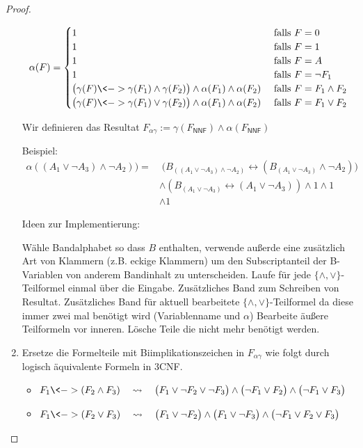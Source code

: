\begin{proof}
\begin{enumerate}
 
 
 $$\alpha(F)=
 \begin{cases}
   1 & \text{ falls } F=0\\
   1 & \text{ falls } F=1\\
   1 & \text{ falls } F=A\\
   1 & \text{ falls } F=\neg F_1\\
   \big(\gamma(F)\<-> \gamma(F_1) \land \gamma(F_2)\big)\land\alpha(F_1)\land\alpha(F_2) & \text{ falls } F=F_1\land F_2\\
   \big(\gamma(F)\<-> \gamma(F_1) \lor \gamma(F_2)\big)\land\alpha(F_1)\land\alpha(F_2) & \text{ falls } F=F_1\lor F_2
  \end{cases}$$
  
  Wir definieren das Resultat $F_{\alpha\gamma}:=\gamma(F_\mathsf{NNF})\land \alpha(F_\mathsf{NNF})$
  
  Beispiel:
  \begin{align*}
   \alpha((A_1\lor \neg A_3)\land \neg A_2)) = & \;
  \big(B_{((A_1\lor \neg A_3)\land \neg A_2)} \leftrightarrow (B_{(A_1\lor \neg A_3)} \land \neg A_2)\big)\\
  & \land (B_{(A_1\lor \neg A_3)} \leftrightarrow (A_1\lor \neg A_3)) \land 1 \land 1\\
  & \land 1
  \end{align*}

  
  Ideen zur Implementierung:
  
  Wähle Bandalphabet so dass $B$ enthalten, verwende außerde eine zusätzlich Art von Klammern (z.B. eckige Klammern) um den Subscriptanteil der B-Variablen von anderem Bandinhalt zu unterscheiden.
  Laufe für jede $\{\land,\lor\}$-Teilformel einmal über die Eingabe.
  Zusätzliches Band zum Schreiben von Resultat.
  Zusätzliches Band für aktuell bearbeitete $\{\land,\lor\}$-Teilformel da diese immer zwei mal benötigt wird (Variablenname und $\alpha$)
  Bearbeite äußere Teilformeln vor inneren.
  Lösche Teile die nicht mehr benötigt werden.
\item Ersetze die Formelteile mit Biimplikationszeichen in $F_{\alpha\gamma}$ wie folgt durch logisch äquivalente Formeln in 3CNF.
	\begin{itemize}
	\item $F_1\<-> (F_2\land F_3)
		\quad\rightsquigarrow\quad \big(F_1\lor \neg F_2\lor \neg F_3\big)\land \big(\neg F_1\lor F_2\big)\land \big(\neg F_1\lor F_3\big)
		$
	\item $F_1\<-> (F_2\lor F_3)
		\quad\rightsquigarrow\quad \big(F_1\lor \neg F_2\big)\land\big(F_1\lor \neg F_3\big)\land \big(\neg F_1\lor F_2\lor F_3\big)
$
	\end{itemize}
	

\end{enumerate}
\end{proof}
